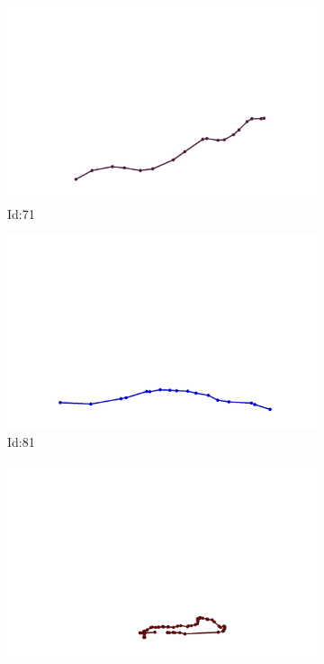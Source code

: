 \documentclass[12pt,twoside]{report}
\begin{document}
\begin{figure}
\centering
\begin{subfigure}[b]{0.20\textwidth}
\centering
\includegraphics[width=\textwidth]{../trajectories/71.png}
\caption{Id:71}
\end{subfigure}
\begin{subfigure}[b]{0.20\textwidth}
\centering
\includegraphics[width=\textwidth]{../trajectories/81.png}
\caption{Id:81}
\end{subfigure}
\begin{subfigure}[b]{0.20\textwidth}
\centering
\includegraphics[width=\textwidth]{../trajectories/131.png}

\end{subfigure}
\end{figure}
\end{document}
